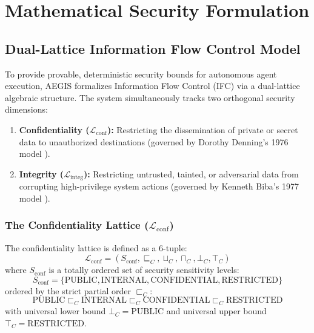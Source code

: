 \chapter{Mathematical Security Formulation}
\label{chap:math}

\section{Dual-Lattice Information Flow Control Model}
To provide provable, deterministic security bounds for autonomous agent execution, AEGIS formalizes Information Flow Control (IFC) via a dual-lattice algebraic structure. The system simultaneously tracks two orthogonal security dimensions:
\begin{enumerate}
    \item \textbf{Confidentiality ($\mathcal{L}_{\text{conf}}$):} Restricting the dissemination of private or secret data to unauthorized destinations (governed by Dorothy Denning's 1976 model \cite{denning1976lattice}).
    \item \textbf{Integrity ($\mathcal{L}_{\text{integ}}$):} Restricting untrusted, tainted, or adversarial data from corrupting high-privilege system actions (governed by Kenneth Biba's 1977 model \cite{biba1977integrity}).
\end{enumerate}

\subsection{The Confidentiality Lattice ($\mathcal{L}_{\text{conf}}$)}
\begin{definition}
The confidentiality lattice is defined as a 6-tuple:
\begin{equation}
\mathcal{L}_{\text{conf}} = (S_{\text{conf}}, \sqsubseteq_C, \sqcup_C, \sqcap_C, \bot_C, \top_C)
\end{equation}
where $S_{\text{conf}}$ is a totally ordered set of security sensitivity levels:
\begin{equation}
S_{\text{conf}} = \{\text{PUBLIC}, \text{INTERNAL}, \text{CONFIDENTIAL}, \text{RESTRICTED}\}
\end{equation}
ordered by the strict partial order $\sqsubset_C$:
\begin{equation}
\text{PUBLIC} \sqsubset_C \text{INTERNAL} \sqsubset_C \text{CONFIDENTIAL} \sqsubset_C \text{RESTRICTED}
\end{equation}
with universal lower bound $\bot_C = \text{PUBLIC}$ and universal upper bound $\top_C = \text{RESTRICTED}$.
\end{definition}

